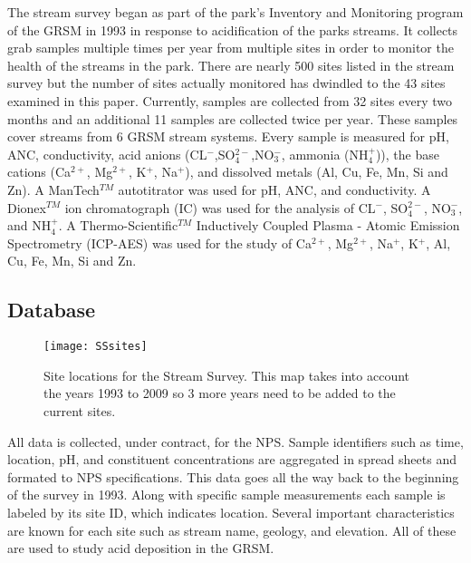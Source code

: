 The stream survey began as part of the park's Inventory and Monitoring program of the GRSM in 1993 in response to acidification of the parks streams.
It collects grab samples multiple times per year from multiple sites in order to monitor the health of the streams in the park.
There are nearly 500 sites listed in the stream survey but the number of sites actually monitored has dwindled to the 43 sites examined in this paper.
Currently, samples are collected from 32 sites every two months and an additional 11 samples are collected twice per year.  
These samples cover streams from 6 GRSM stream systems. 
Every sample is  measured for pH, ANC, conductivity, acid anions (CL$^-$,SO$_4^{2-}$,NO$_3^-$, ammonia (NH$_4^+$)), the base cations (Ca$^{2+}$, Mg$^{2+}$, K$^+$, Na$^+$), and dissolved metals (Al, Cu, Fe, Mn, Si and Zn).  
A ManTech$^{TM}$ autotitrator was used for pH, ANC, and conductivity.  
A Dionex$^{TM}$ ion chromatograph (IC) was used for the analysis of CL$^-$, SO$_4^{2-}$, NO$_3^-$, and NH$_4^+$.  
A Thermo-Scientific$^{TM}$ Inductively Coupled Plasma - Atomic Emission Spectrometry (ICP-AES) was used for the study of Ca$^{2+}$, Mg$^{2+}$, Na$^+$, K$^+$, Al, Cu, Fe, Mn, Si and Zn.

\subsection{Database}

\begin{figure}[h!]
  \centering
  \texttt{[image: SSsites]}\\
  \caption{Site locations for the Stream Survey.  This map takes into account the years 1993 to 2009 so 3 more years need to be added to the current sites. }\label{fig:SSsites}
\end{figure}

All data is collected, under contract, for the NPS.
Sample identifiers such as time, location, pH, and constituent concentrations are aggregated in spread sheets and formated to NPS specifications.
This data goes all the way back to the beginning of the survey in 1993.
Along with specific sample measurements each sample is labeled by its site ID, which indicates location.
Several important characteristics are known for each site such as stream name, geology, and elevation.
All of these are used to study acid deposition in the GRSM.

